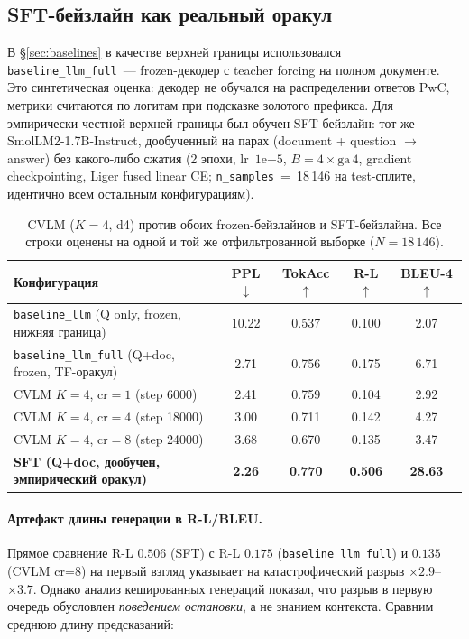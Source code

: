 \documentclass[a4paper,12pt]{extarticle}
\begin{document}
\subsection{SFT-бейзлайн как реальный оракул}\label{sec:sft-baseline}

В §\ref{sec:baselines} в качестве верхней границы использовался \texttt{baseline\_llm\_full}~--- frozen-декодер с teacher forcing на полном документе. Это синтетическая оценка: декодер не обучался на распределении ответов PwC, метрики считаются по логитам при подсказке золотого префикса. Для эмпирически честной верхней границы был обучен SFT-бейзлайн: тот же SmolLM2-1.7B-Instruct, дообученный на парах (document + question $\to$ answer) без какого-либо сжатия (2 эпохи, lr~$1\mathrm{e}{-5}$, $B=4 \times \mathrm{ga}\,4$, gradient checkpointing, Liger fused linear CE; \texttt{n\_samples}~=~18\,146 на test-сплите, идентично всем остальным конфигурациям).

\begin{table}[ht]
\centering
\caption{CVLM ($K=4$, d4) против обоих frozen-бейзлайнов и SFT-бейзлайна. Все строки оценены на одной и той же отфильтрованной выборке ($N = 18\,146$).}
\label{tab:vs-sft}
\footnotesize
\begin{tabular}{lcccc}
\toprule
\textbf{Конфигурация} & \textbf{PPL} $\downarrow$ & \textbf{TokAcc} $\uparrow$ & \textbf{R-L} $\uparrow$ & \textbf{BLEU-4} $\uparrow$ \\
\midrule
\texttt{baseline\_llm} (Q only, frozen, нижняя граница) & 10.22 & 0.537 & 0.100 & 2.07 \\
\texttt{baseline\_llm\_full} (Q+doc, frozen, TF-оракул) & 2.71  & 0.756 & 0.175 & 6.71 \\
\midrule
CVLM $K=4$, $\text{cr}=1$ (step 6000)                   & 2.41  & 0.759 & 0.104 & 2.92 \\
CVLM $K=4$, $\text{cr}=4$ (step 18000)                  & 3.00  & 0.711 & 0.142 & 4.27 \\
CVLM $K=4$, $\text{cr}=8$ (step 24000)                  & 3.68  & 0.670 & 0.135 & 3.47 \\
\midrule
\textbf{SFT (Q+doc, дообучен, эмпирический оракул)}     & \textbf{2.26} & \textbf{0.770} & \textbf{0.506} & \textbf{28.63} \\
\bottomrule
\end{tabular}
\end{table}

\paragraph{Артефакт длины генерации в R-L/BLEU.} Прямое сравнение R-L $0.506$ (SFT) с R-L $0.175$ (\texttt{baseline\_llm\_full}) и $0.135$ (CVLM cr=8) на первый взгляд указывает на катастрофический разрыв $\times 2.9$--$\times 3.7$. Однако анализ кешированных генераций показал, что разрыв в первую очередь обусловлен \emph{поведением остановки}, а не знанием контекста. Сравним среднюю длину предсказаний:
\end{document}
